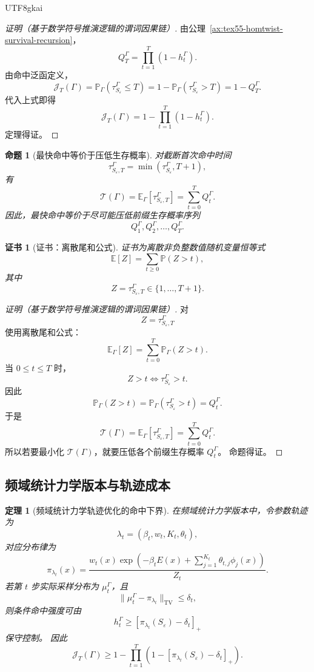 \documentclass[12pt]{article}
\newtheorem{theorem}{定理}[section]
\newtheorem{proposition}{命题}[section]
\newtheorem{Certificate}{证书}[section]
\newcommand{\TV}{\mathrm{TV}}
\begin{document}
\begin{CJK*}{UTF8}{gkai}
\begin{proof}[证明（基于数学符号推演逻辑的谓词因果链）]
由公理~\ref{ax:tex55-homtwist-survival-recursion}，
\[
  Q_T^\Gamma
  =
  \prod_{t=1}^{T}(1-h_t^\Gamma).
\]
由命中泛函定义，
\[
  \mathcal J_T(\Gamma)
  =
  \mathbb P_\Gamma(\tau_{S_\varepsilon}^\Gamma\le T)
  =
  1-\mathbb P_\Gamma(\tau_{S_\varepsilon}^\Gamma>T)
  =
  1-Q_T^\Gamma.
\]
代入上式即得
\[
  \mathcal J_T(\Gamma)
  =
  1-
  \prod_{t=1}^{T}(1-h_t^\Gamma).
\]
定理得证。
\end{proof}

\begin{proposition}[最快命中等价于压低生存概率]
\label{prop:tex55-homtwist-fast-hit-survival}
对截断首次命中时间
\[
  \tau_{S_\varepsilon,T}^\Gamma
  =
  \min(\tau_{S_\varepsilon}^\Gamma,T+1),
\]
有
\[
  \mathcal T(\Gamma)
  =
  \mathbb E_\Gamma[\tau_{S_\varepsilon,T}^\Gamma]
  =
  \sum_{t=0}^{T}Q_t^\Gamma.
\]
因此，最快命中等价于尽可能压低前缀生存概率序列
\[
  Q_1^\Gamma,Q_2^\Gamma,\ldots,Q_T^\Gamma.
\]
\end{proposition}

\begin{Certificate}[证书：离散尾和公式]
\label{cert:tex55-homtwist-fast-hit-survival}
证书为离散非负整数值随机变量恒等式
\[
  \mathbb E[Z]=\sum_{t\ge0}\mathbb P(Z>t),
\]
其中
\[
  Z=\tau_{S_\varepsilon,T}^\Gamma\in\{1,\ldots,T+1\}.
\]
\end{Certificate}

\begin{proof}[证明（基于数学符号推演逻辑的谓词因果链）]
对
\[
  Z=\tau_{S_\varepsilon,T}^\Gamma
\]
使用离散尾和公式：
\[
  \mathbb E_\Gamma[Z]
  =
  \sum_{t=0}^{T}\mathbb P_\Gamma(Z>t).
\]
当 \(0\le t\le T\) 时，
\[
  Z>t
  \Longleftrightarrow
  \tau_{S_\varepsilon}^\Gamma>t.
\]
因此
\[
  \mathbb P_\Gamma(Z>t)
  =
  \mathbb P_\Gamma(\tau_{S_\varepsilon}^\Gamma>t)
  =
  Q_t^\Gamma.
\]
于是
\[
  \mathcal T(\Gamma)
  =
  \mathbb E_\Gamma[\tau_{S_\varepsilon,T}^\Gamma]
  =
  \sum_{t=0}^{T}Q_t^\Gamma.
\]
所以若要最小化 \(\mathcal T(\Gamma)\)，就要压低各个前缀生存概率 \(Q_t^\Gamma\)。
命题得证。
\end{proof}

\subsection{频域统计力学版本与轨迹成本}
\label{subsec:tex55-homtwist-frequency-version}

\begin{theorem}[频域统计力学轨迹优化的命中下界]
\label{thm:tex55-homtwist-frequency-trajectory}
在频域统计力学版本中，令参数轨迹为
\[
  \lambda_t=(\beta_t,w_t,K_t,\theta_t),
\]
对应分布律为
\[
  \pi_{\lambda_t}(x)
  =
  \frac{
  w_t(x)
  \exp\left(
  -\beta_tE(x)
  +
  \sum_{j=1}^{K_t}\theta_{t,j}\phi_j(x)
  \right)
  }{
  Z_t
  }.
\]
若第 \(t\) 步实际采样分布为 \(\mu_t^\Gamma\)，且
\[
  \|\mu_t^\Gamma-\pi_{\lambda_t}\|_{\TV}\le\delta_t,
\]
则条件命中强度可由
\[
  h_t^\Gamma
  \ge
  \left[
  \pi_{\lambda_t}(S_\varepsilon)-\delta_t
  \right]_+
\]
保守控制。
因此
\[
  \mathcal J_T(\Gamma)
  \ge
  1-
  \prod_{t=1}^{T}
  \left(
  1-
  \left[
  \pi_{\lambda_t}(S_\varepsilon)-\delta_t
  \right]_+
  \right).
\]
\end{theorem}


\end{CJK*}
\end{document}
